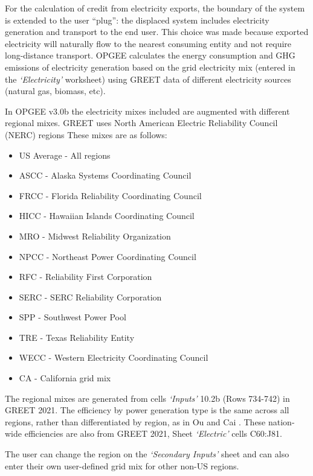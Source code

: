 \documentclass[11pt]{report}
\newcommand{\version}{v3.0b }
\newcommand{\sheet}[1]{\textit{`{#1}'}}
\begin{document}
For the calculation of credit from electricity exports, the boundary of the system is extended to the user ``plug'': the displaced system includes electricity generation and transport to the end user. This choice was made because exported electricity will naturally flow to the nearest consuming entity and not require long-distance transport. OPGEE calculates the energy consumption and GHG emissions of electricity generation based on the grid electricity mix (entered in the \sheet{Electricity} worksheet) using GREET data of different electricity sources (natural gas, biomass, etc).

In OPGEE \version the electricity mixes included are augmented with different regional mixes. GREET uses North American Electric Reliability Council (NERC) regions \cite{Ou2020} These mixes are as follows:
\begin{itemize}
\item US Average - All regions
\item ASCC - Alaska Systems Coordinating Council
\item FRCC - Florida Reliability Coordinating Council
\item HICC - Hawaiian Islands Coordinating Council
\item MRO - Midwest Reliability Organization
\item NPCC - Northeast Power Coordinating Council
\item RFC - Reliability First Corporation
\item SERC - SERC Reliability Corporation
\item SPP - Southwest Power Pool
\item TRE - Texas Reliability Entity
\item WECC - Western Electricity Coordinating Council
\item CA - California grid mix
\end{itemize}

The regional mixes are generated from cells \sheet{Inputs} 10.2b (Rows 734-742) in GREET 2021. The efficiency by power generation type is the same across all regions, rather than differentiated by region, as in Ou and Cai \cite[Table 3]{Ou2020}. These nation-wide efficiencies are also from GREET 2021, Sheet \sheet{Electric} cells C60:J81.

The user can change the region on the \sheet{Secondary Inputs} sheet and can also enter their own user-defined grid mix for other non-US regions.

\newpage
\end{document}
